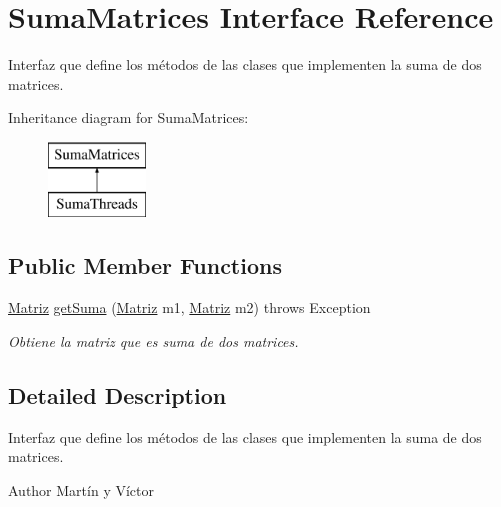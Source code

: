 \hypertarget{interfaceSumaMatrices}{\section{Suma\-Matrices Interface Reference}
\label{interfaceSumaMatrices}
}


Interfaz que define los métodos de las clases que implementen la suma de dos matrices.  


Inheritance diagram for Suma\-Matrices\-:\begin{figure}[H]
\begin{center}
\leavevmode
\includegraphics[height=2.000000cm]{interfaceSumaMatrices}
\end{center}
\end{figure}
\subsection*{Public Member Functions}
\begin{DoxyCompactItemize}
\item 
\hyperlink{classMatriz}{Matriz} \hyperlink{interfaceSumaMatrices_aaa4f45720c4f880570897a307d78c60d}{get\-Suma} (\hyperlink{classMatriz}{Matriz} m1, \hyperlink{classMatriz}{Matriz} m2)  throws Exception
\begin{DoxyCompactList}\small\item\em Obtiene la matriz que es suma de dos matrices. \end{DoxyCompactList}\end{DoxyCompactItemize}


\subsection{Detailed Description}
Interfaz que define los métodos de las clases que implementen la suma de dos matrices. 

\begin{DoxyAuthor}{Author}
Martín y Víctor 
\end{DoxyAuthor}


